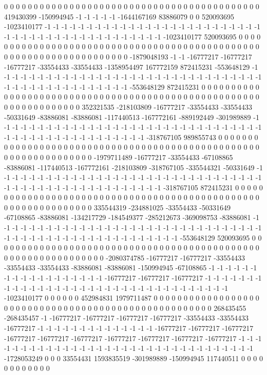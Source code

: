 0 0 0 0 0 0 0 0 0 0 0 0 0 0 0 0 0 0 0 0 0 0 0 0 0 0 0 0 0 0 0 0 0 0 0 0 0 0 0 0 0 0 0 419430399 -150994945 -1 -1 -1 -1 -1 -1644167169 83886079 0 0 520093695 -1023410177 -1 -1 -1 -1 -1 -1 -1 -1 -1 -1 -1 -1 -1 -1 -1 -1 -1 -1 -1 -1 -1 -1 -1 -1 -1 -1 -1 -1 -1 -1 -1 -1 -1 -1 -1 -1 -1 -1 -1 -1 -1 -1 -1 -1 -1 -1023410177 520093695 0 0 0 0 0 0 0 0 0 0 0 0 0 0 0 0 0 0 0 0 0 0 0 0 0
0 0 0 0 0 0 0 0 0 0 0 0 0 0 0 0 0 0 0 0 0 0 0 0 0 0 0 0 0 0 0 0 0 0 0 0 0 0 0 0 0 0 0 -1879048193 -1 -1 -16777217 -16777217 -16777217 -33554433 -33554433 -1358954497 167772159 872415231 -553648129 -1 -1 -1 -1 -1 -1 -1 -1 -1 -1 -1 -1 -1 -1 -1 -1 -1 -1 -1 -1 -1 -1 -1 -1 -1 -1 -1 -1 -1 -1 -1 -1 -1 -1 -1 -1 -1 -1 -1 -1 -1 -1 -1 -1 -1 -1 -1 -553648129 872415231 0 0 0 0 0 0 0 0 0 0 0 0 0 0 0 0 0 0 0 0 0 0 0 0
0 0 0 0 0 0 0 0 0 0 0 0 0 0 0 0 0 0 0 0 0 0 0 0 0 0 0 0 0 0 0 0 0 0 0 0 0 0 0 0 0 0 352321535 -218103809 -16777217 -33554433 -33554433 -50331649 -83886081 -83886081 -117440513 -167772161 -889192449 -301989889 -1 -1 -1 -1 -1 -1 -1 -1 -1 -1 -1 -1 -1 -1 -1 -1 -1 -1 -1 -1 -1 -1 -1 -1 -1 -1 -1 -1 -1 -1 -1 -1 -1 -1 -1 -1 -1 -1 -1 -1 -1 -1 -1 -1 -1 -1 -1 -1 -1 -318767105 989855743 0 0 0 0 0 0 0 0 0 0 0 0 0 0 0 0 0 0 0 0 0 0 0
0 0 0 0 0 0 0 0 0 0 0 0 0 0 0 0 0 0 0 0 0 0 0 0 0 0 0 0 0 0 0 0 0 0 0 0 0 0 0 0 0 0 -1979711489 -16777217 -33554433 -67108865 -83886081 -117440513 -167772161 -218103809 -318767105 -335544321 -50331649 -1 -1 -1 -1 -1 -1 -1 -1 -1 -1 -1 -1 -1 -1 -1 -1 -1 -1 -1 -1 -1 -1 -1 -1 -1 -1 -1 -1 -1 -1 -1 -1 -1 -1 -1 -1 -1 -1 -1 -1 -1 -1 -1 -1 -1 -1 -1 -1 -1 -1 -1 -318767105 872415231 0 0 0 0 0 0 0 0 0 0 0 0 0 0 0 0 0 0 0 0 0 0
0 0 0 0 0 0 0 0 0 0 0 0 0 0 0 0 0 0 0 0 0 0 0 0 0 0 0 0 0 0 0 0 0 0 0 0 0 0 0 0 0 335544319 -234881025 -33554433 -50331649 -67108865 -83886081 -134217729 -184549377 -285212673 -369098753 -83886081 -1 -1 -1 -1 -1 -1 -1 -1 -1 -1 -1 -1 -1 -1 -1 -1 -1 -1 -1 -1 -1 -1 -1 -1 -1 -1 -1 -1 -1 -1 -1 -1 -1 -1 -1 -1 -1 -1 -1 -1 -1 -1 -1 -1 -1 -1 -1 -1 -1 -1 -1 -1 -1 -553648129 520093695 0 0 0 0 0 0 0 0 0 0 0 0 0 0 0 0 0 0 0 0 0
0 0 0 0 0 0 0 0 0 0 0 0 0 0 0 0 0 0 0 0 0 0 0 0 0 0 0 0 0 0 0 0 0 0 0 0 0 0 0 0 0 -2080374785 -16777217 -16777217 -33554433 -33554433 -33554433 -83886081 -83886081 -150994945 -67108865 -1 -1 -1 -1 -1 -1 -1 -1 -1 -1 -1 -1 -1 -1 -1 -1 -1 -1 -16777217 -16777217 -16777217 -1 -1 -1 -1 -1 -1 -1 -1 -1 -1 -1 -1 -1 -1 -1 -1 -1 -1 -1 -1 -1 -1 -1 -1 -1 -1 -1 -1 -1 -1 -1 -1 -1 -1 -1023410177 0 0 0 0 0 0 452984831 1979711487 0 0 0 0 0 0 0 0 0 0 0 0 0
0 0 0 0 0 0 0 0 0 0 0 0 0 0 0 0 0 0 0 0 0 0 0 0 0 0 0 0 0 0 0 0 0 0 0 0 0 0 0 0 268435455 -268435457 -1 -16777217 -16777217 -16777217 -16777217 -33554433 -33554433 -16777217 -1 -1 -1 -1 -1 -1 -1 -1 -1 -1 -1 -1 -1 -1 -16777217 -16777217 -16777217 -16777217 -16777217 -16777217 -16777217 -16777217 -16777217 -16777217 -1 -1 -1 -1 -1 -1 -1 -1 -1 -1 -1 -1 -1 -1 -1 -1 -1 -1 -1 -1 -1 -1 -1 -1 -1 -1 -1 -1 -1 -1 -1 -1 -1 -1728053249 0 0 0 33554431 1593835519 -301989889 -150994945 117440511 0 0 0 0 0 0 0 0 0 0 0 0
